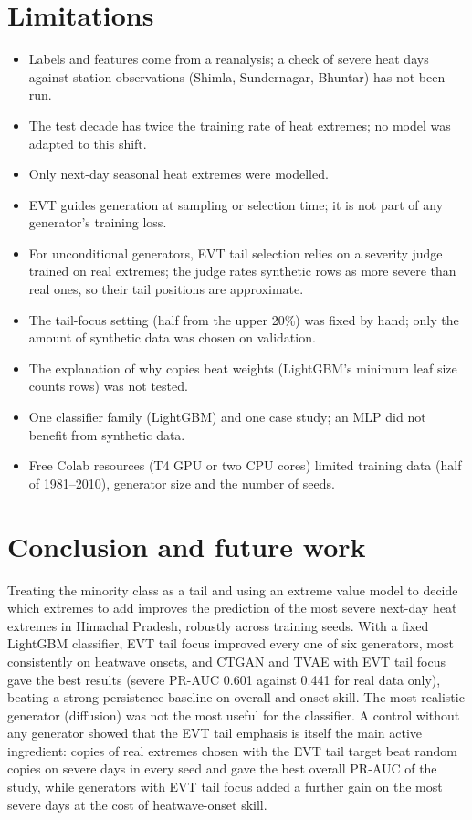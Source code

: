 \documentclass[11pt,a4paper]{article}
\begin{document}
\section{Limitations}
\begin{itemize}
  \item Labels and features come from a reanalysis; a check of severe heat days against station observations
        (Shimla, Sundernagar, Bhuntar) has not been run.
  \item The test decade has twice the training rate of heat extremes; no model was adapted to this shift.
  \item Only next-day seasonal heat extremes were modelled.
  \item EVT guides generation at sampling or selection time; it is not part of any generator's training loss.
  \item For unconditional generators, EVT tail selection relies on a severity judge trained on real extremes;
        the judge rates synthetic rows as more severe than real ones, so their tail positions are approximate.
  \item The tail-focus setting (half from the upper 20\%) was fixed by hand; only the amount of synthetic data
        was chosen on validation.
  \item The explanation of why copies beat weights (LightGBM's minimum leaf size counts rows) was not tested.
  \item One classifier family (LightGBM) and one case study; an MLP did not benefit from synthetic data.
  \item Free Colab resources (T4 GPU or two CPU cores) limited training data (half of 1981--2010), generator
        size and the number of seeds.
\end{itemize}

\section{Conclusion and future work}
Treating the minority class as a tail and using an extreme value model to decide which extremes to add
improves the prediction of the most severe next-day heat extremes in Himachal Pradesh, robustly across
training seeds. With a fixed LightGBM classifier, EVT tail focus improved every one of six generators, most
consistently on heatwave onsets, and CTGAN and TVAE with EVT tail focus gave the best results (severe PR-AUC
0.601 against 0.441 for real data only), beating a strong persistence baseline on overall and onset skill. The
most realistic generator (diffusion) was not the most useful for the classifier. A control without any generator
showed that the EVT tail emphasis is itself the main active ingredient: copies of real extremes chosen with the EVT
tail target beat random copies on severe days in every seed and gave the best overall PR-AUC of the study, while
generators with EVT tail focus added a further gain on the most severe days at the cost of heatwave-onset skill.
\end{document}
